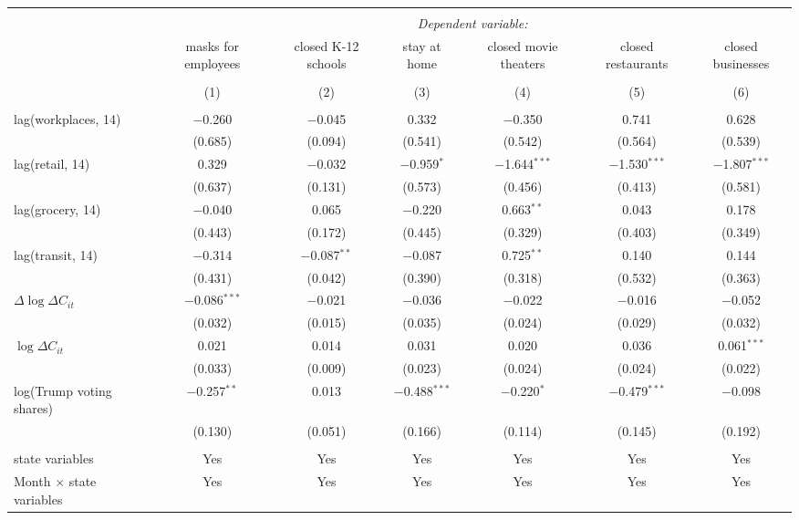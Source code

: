 \begin{tabular}{@{\extracolsep{1pt}}lcccccc} 
\\[-1.8ex]\hline 
\hline \\[-1.8ex] 
 & \multicolumn{6}{c}{\textit{Dependent variable:}} \\ 
\cline{2-7} 
 & masks for employees & closed K-12 schools & stay at home & closed movie theaters & closed restaurants & closed businesses \\ 
\\[-1.8ex] & (1) & (2) & (3) & (4) & (5) & (6)\\ 
\hline \\[-1.8ex] 
 lag(workplaces, 14) & $-$0.260 & $-$0.045 & 0.332 & $-$0.350 & 0.741 & 0.628 \\ 
  & (0.685) & (0.094) & (0.541) & (0.542) & (0.564) & (0.539) \\ 
  lag(retail, 14) & 0.329 & $-$0.032 & $-$0.959$^{*}$ & $-$1.644$^{***}$ & $-$1.530$^{***}$ & $-$1.807$^{***}$ \\ 
  & (0.637) & (0.131) & (0.573) & (0.456) & (0.413) & (0.581) \\ 
  lag(grocery, 14) & $-$0.040 & 0.065 & $-$0.220 & 0.663$^{**}$ & 0.043 & 0.178 \\ 
  & (0.443) & (0.172) & (0.445) & (0.329) & (0.403) & (0.349) \\ 
  lag(transit, 14) & $-$0.314 & $-$0.087$^{**}$ & $-$0.087 & 0.725$^{**}$ & 0.140 & 0.144 \\ 
  & (0.431) & (0.042) & (0.390) & (0.318) & (0.532) & (0.363) \\ 
  $\Delta \log \Delta C_{it}$ & $-$0.086$^{***}$ & $-$0.021 & $-$0.036 & $-$0.022 & $-$0.016 & $-$0.052 \\ 
  & (0.032) & (0.015) & (0.035) & (0.024) & (0.029) & (0.032) \\ 
  $\log \Delta C_{it}$ & 0.021 & 0.014 & 0.031 & 0.020 & 0.036 & 0.061$^{***}$ \\ 
  & (0.033) & (0.009) & (0.023) & (0.024) & (0.024) & (0.022) \\ 
  log(Trump voting shares) & $-$0.257$^{**}$ & 0.013 & $-$0.488$^{***}$ & $-$0.220$^{*}$ & $-$0.479$^{***}$ & $-$0.098 \\ 
  & (0.130) & (0.051) & (0.166) & (0.114) & (0.145) & (0.192) \\ 
 \hline \\[-1.8ex] 
state variables & Yes & Yes & Yes & Yes & Yes & Yes \\ 
Month $\times$ state variables & Yes & Yes & Yes & Yes & Yes & Yes \\ 

\end{tabular}
